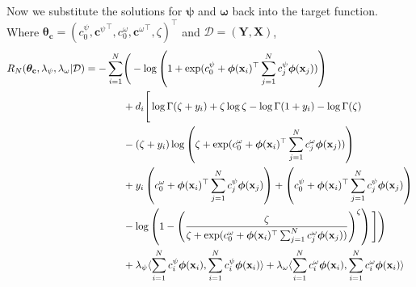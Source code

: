 \documentclass[12pt]{article}
\newcommand{\X}{\mathbf{X}}
\newcommand{\x}{\mathbf{x}}
\newcommand{\Y}{\mathbf{Y}}
\newcommand{\bc}{\mathbf{c}}
\renewcommand{\r}{\right}
\renewcommand{\l}{\left}
\newcommand{\bomega}{\bm{\omega}}
\newcommand{\bpsi}{\bm{\psi}}
\newcommand{\bphi}{\bm{\phi}}
\newcommand{\btheta}{\bm{\theta}}
\begin{document}
Now we substitute the solutions for $\bpsi$ and $\bomega$ back into the target function. Where $\btheta_{\bc} = (c^{\psi}_0, {\bc^\psi}^\top, c^{\omega}_0, {\bc^\omega}^\top, \zeta)^\top$ and $\mathcal{D} = (\Y, \X)$,
\begin{equation}
  R_N (\btheta_{\bc}, \lambda_\psi, \lambda_\omega | \mathcal{D}) \\= \begin{aligned}[t]
    - \sum^N_{i=1} & \Bigg( - \log \l(1 + \exp(c^\psi_0 + \bphi(\x_i)^\top \sum^N_{j=1} c^\psi_j \bphi(\x_j)) \r) \\
    & + d_i \Bigg[ \log \Gamma( \zeta + y_i ) + \zeta \log \zeta - \log \Gamma (1 + y_i) - \log \Gamma (\zeta) \\
      & - (\zeta + y_i) \log \l( \zeta + \exp(c^\omega_0 + \bphi(\x_i)^\top \sum^N_{j=1} c^\omega_j \bphi(\x_j)) \r) \\
      & + y_i\l(c^\omega_0 + \bphi(\x_i)^\top \sum^N_{j=1} c^\psi_j \bphi(\x_j)\r) + \l(c^\psi_0 + \bphi(\x_i)^\top\sum^N_{j=1} c^\psi_j \bphi(\x_j) \r)\\
      & - \log \l( 1 - \l( \frac{\zeta}{\zeta + \exp(c^\omega_0 + \bphi(\x_i)^\top \sum^N_{j=1} c^\omega_j \bphi(\x_j))} \r)^\zeta \r) \Bigg] \Bigg) \\
    & + \lambda_\psi \langle \sum^N_{i=1} c^\psi_i \bphi(\x_i), \sum^N_{i=1} c^\psi_i \bphi(\x_i)\rangle + \lambda_\omega \langle \sum^N_{i=1} c^\omega_i \bphi(\x_i), \sum^N_{i=1} c^\omega_i \bphi(\x_i)\rangle
    \end{aligned}
\end{equation} 
\end{document}
